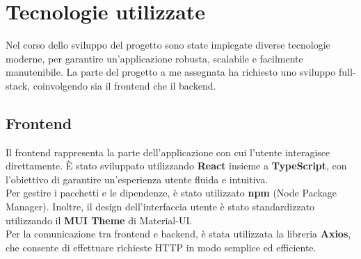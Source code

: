 \chapter{Tecnologie utilizzate}
Nel corso dello sviluppo del progetto sono state impiegate diverse tecnologie 
moderne, per garantire un'applicazione robusta, scalabile e facilmente manutenibile. 
La parte del progetto a me assegnata ha richiesto uno sviluppo full-stack, 
coinvolgendo sia il frontend che il backend.

\section{Frontend} 
Il frontend rappresenta la parte dell'applicazione con cui l'utente interagisce direttamente. 
È stato sviluppato utilizzando \textbf{React} insieme a \textbf{TypeScript}, 
con l'obiettivo di garantire un'esperienza utente fluida e intuitiva.
\\
Per gestire i pacchetti e le dipendenze, è stato utilizzato \textbf{npm} (Node Package Manager).
Inoltre, il design dell'interfaccia utente è stato standardizzato 
utilizzando il \textbf{MUI Theme} di Material-UI.
\\
Per la comunicazione tra frontend e backend, è stata utilizzata la libreria \textbf{Axios}, 
che consente di effettuare richieste HTTP in modo semplice ed efficiente.


